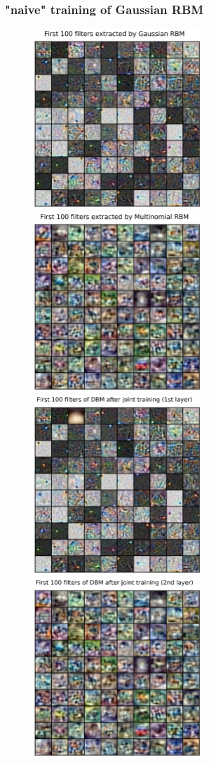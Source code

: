 \clearpage
\newpage
\subsubsection{"naive" training of Gaussian RBM}
\begin{figure}[h]
\begin{mdframed}
\centering
\includegraphics[width=2.5in]{dbm-cifar-naive/grbm.png}
\quad
\includegraphics[width=2.5in]{dbm-cifar-naive/mrbm.png}
\\[2em]
\includegraphics[width=2.5in]{dbm-cifar-naive/W1_joint.png}
\quad
\includegraphics[width=2.5in]{dbm-cifar-naive/W2_joint.png}

\end{mdframed}
\end{figure}
